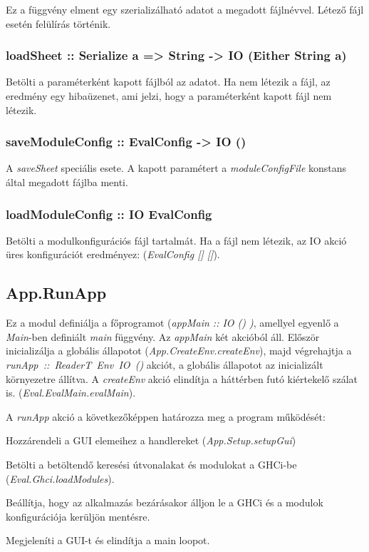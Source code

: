 Ez a függvény elment egy szerializálható adatot a megadott fájlnévvel. Létező fájl esetén felülírás történik. 

\subsubsection{loadSheet :: Serialize a => String -> IO (Either String a)}

Betölti a paraméterként kapott fájlból az adatot. Ha nem létezik a fájl, az eredmény egy hibaüzenet, ami jelzi, hogy a paraméterként kapott fájl nem létezik.

\subsubsection{saveModuleConfig :: EvalConfig -> IO ()}

A \textit{saveSheet} speciális esete. A kapott paramétert a \textit{moduleConfigFile} konstans által megadott fájlba menti.

\subsubsection{loadModuleConfig :: IO EvalConfig}

Betölti a modulkonfigurációs fájl tartalmát. Ha a fájl nem létezik, az IO akció üres konfigurációt eredményez: (\textit{EvalConfig [] []}).

\subsection{App.RunApp}

Ez a modul definiálja a főprogramot (\textit{appMain :: IO () )}, amellyel egyenlő a \textit{Main}-ben definiált \textit{main} függvény. Az \textit{appMain} két akcióból áll. Először inicializálja a globális állapotot (\textit{App.CreateEnv.createEnv}), majd végrehajtja a \mbox{\textit{runApp :: ReaderT Env IO ()}} akciót, a globális állapotot az inicializált környezetre állítva. A 
\textit{createEnv} akció elindítja a háttérben futó kiértekelő szálat is. (\textit{Eval.EvalMain.evalMain}).

A \textit{runApp} akció a következőképpen határozza meg a program működését:
\begin{compactenum}
	\item Hozzárendeli a GUI elemeihez a handlereket (\textit{App.Setup.setupGui})
	\item Betölti a betöltendő keresési útvonalakat és modulokat a GHCi-be (\textit{Eval.Ghci.loadModules}).
	\item Beállítja, hogy az alkalmazás bezárásakor álljon le a GHCi és a modulok konfigurációja kerüljön mentésre.
	\item Megjeleníti a GUI-t és elindítja a main loopot. 
\end{compactenum}

